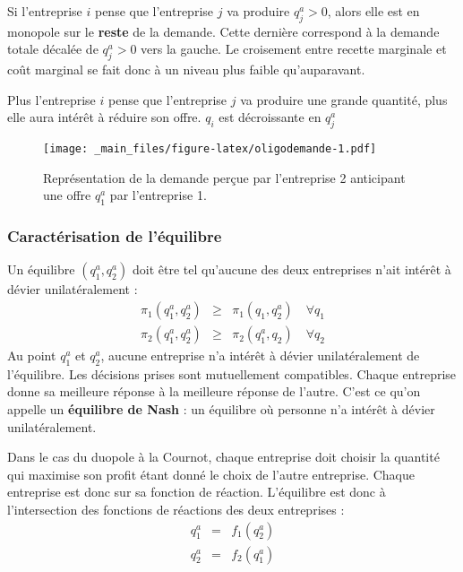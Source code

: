 \documentclass[
]{book}
\theoremstyle{definition}
\theoremstyle{definition}
\theoremstyle{definition}
\theoremstyle{definition}
\theoremstyle{remark}
\begin{document}
Si l'entreprise \(i\) pense que l'entreprise \(j\) va produire \(q_j^a>0\), alors elle est en monopole sur le \textbf{reste} de la demande.
Cette dernière correspond à la demande totale décalée de \(q_j^a>0\) vers la gauche.
Le croisement entre recette marginale et coût marginal se fait donc à un niveau plus faible qu'auparavant.

Plus l'entreprise \(i\) pense que l'entreprise \(j\) va produire une grande quantité, plus elle aura intérêt à réduire son offre.
\(q_i\) est décroissante en \(q_j^a\)

\begin{figure}
\centering
\texttt{[image: \_main\_files/figure-latex/oligodemande-1.pdf]}
\caption{\label{fig:oligodemande}Représentation de la demande perçue par l'entreprise 2 anticipant une offre \(q_1^a\) par l'entreprise 1.}
\end{figure}

\hypertarget{caractuxe9risation-de-luxe9quilibre}{%
\subsubsection{Caractérisation de l'équilibre}\label{caractuxe9risation-de-luxe9quilibre}}

Un équilibre \((q_1^a, q_2^a)\) doit être tel qu'aucune des deux entreprises n'ait intérêt à dévier unilatéralement :
\[
\begin{array}{rcl}
\pi_1(q_1^a, q_2^a) &\geq& \pi_1(q_1, q_2^a)\quad \forall q_1\\
\pi_2(q_1^a, q_2^a) &\geq& \pi_2(q_1^a, q_2)\quad \forall q_2
\end{array}
\]
Au point \(q_1^a\) et \(q_2^a\), aucune entreprise n'a intérêt à dévier unilatéralement de l'équilibre.
Les décisions prises sont mutuellement compatibles.
Chaque entreprise donne sa meilleure réponse à la meilleure réponse de l'autre.
C'est ce qu'on appelle un \textbf{équilibre de Nash} : un équilibre où personne n'a intérêt à dévier unilatéralement.

Dans le cas du duopole à la Cournot, chaque entreprise doit choisir la quantité qui maximise son profit étant donné le choix de l'autre entreprise.
Chaque entreprise est donc sur sa fonction de réaction.
L'équilibre est donc à l'intersection des fonctions de réactions des deux entreprises :
\[
\begin{array}{rcl}
q_1^a&=&f_1(q_2^a)\\
q_2^a&=&f_2(q_1^a)
\end{array}
\]
\end{document}
